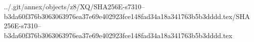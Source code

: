 ../.git/annex/objects/z8/XQ/SHA256E-s7310--b3da60f376b3063063976ea37e69e402923fce148fad34a18a341763b5b3dddd.tex/SHA256E-s7310--b3da60f376b3063063976ea37e69e402923fce148fad34a18a341763b5b3dddd.tex